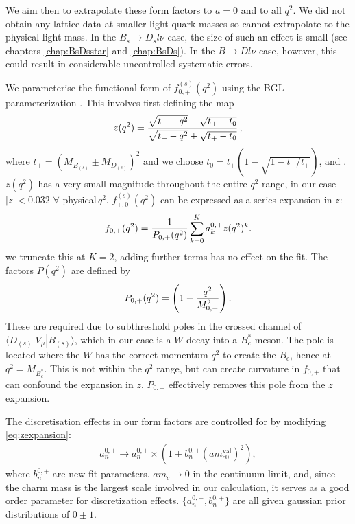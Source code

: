 We aim then to extrapolate these form factors to $a=0$ and to all $q^2$. We did not obtain any lattice data at smaller light quark masses so cannot extrapolate to the physical light mass. In the $B_s\to D_sl\nu$ case, the size of such an effect is small (see chapters \ref{chap:BsDsstar} and \ref{chap:BsDs}). In the $B\to Dl\nu$ case, however, this could result in considerable uncontrolled systematic errors.

We parameterise the functional form of $f^{(s)}_{0,+}(q^2)$ using the BGL parameterization \cite{PhysRevD.79.013008}. This involves first defining the map
\begin{align}
	z(q^2) = {\sqrt{t_+ - q^2} - \sqrt{t_+ - t_0} \over \sqrt{t_+ - q^2} + \sqrt{t_+ - t_0} }\,,
\end{align}
where $t_{\pm} = (M_{B_{(s)}} \pm M_{D_{(s)}})^2$ and we choose $t_0 = t_+( 1 - \sqrt{1 - t_-/t_+})$, and . $z(q^2)$ has a very small magnitude throughout the entire $q^2$ range, in our case $|z| < 0.032 \,\,\forall \,\,$physical$\,q^2$. %
$f^{(s)}_{+,0}(q^2)$ can be expressed as a series expansion in $z$:
\begin{align}
	f_{0,+}(q^2) = {1\over P_{0,+}(q^2)} \sum^K_{k=0} a^{0,+}_k z(q^2)^k.
	\label{eq:zexpansion}
\end{align}
we truncate this at $K=2$, adding further terms has no effect on the fit. The factors $P(q^2)$ are defined by
\begin{align}
	P_{0,+}(q^2) = \left( 1 - {q^2\over M_{0,+}^2}\right).
\end{align}
These are required due to subthreshold poles in the crossed channel of $\langle D_{(s)} | V_{\mu} | B_{(s)} \rangle$, which in our case is a $W$ decay into a $B^*_c$ meson. The pole is located where the $W$ has the correct momentum $q^2$ to create the $B_c$, hence at $q^2=M_{B^*_c}$. This is not within the $q^2$ range, but can create curvature in $f_{0,+}$ that can confound the expansion in $z$. $P_{0,+}$ effectively removes this pole from the $z$ expansion.

The discretisation effects in our form factors are controlled for by modifying \eqref{eq:zexpansion}:
\begin{align}
	a^{0,+}_n \to a^{0,+}_n \times ( 1 + b^{0,+}_n (am^{\text{val}}_{c0})^2 ),
\end{align}
where $b^{0,+}_n$ are new fit parameters. $am_c\to0$ in the continuum limit, and, since the charm mass is the largest scale involved in our calculation, it serves as a good order parameter for discretization effects. $\{a_n^{0,+},b_n^{0,+}\}$ are all given gaussian prior distributions of $0\pm 1$.

